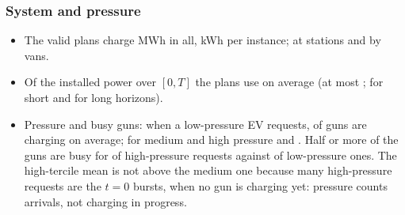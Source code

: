 \subsubsection{System and pressure}
\begin{table}[H]
\centering\small
\caption{Share of the 24 guns busy at the request time of free-choice EVs, by demand pressure tercile.}
\label{tab:utilpressure}

\end{table}
\begin{itemize}
  \item The valid plans charge \UEnergyTotal{} MWh in all, \UEnergyPerInst{} kWh per instance; \UEnergyFCSShare\pct{} at stations and \UEnergyVanShare\pct{} by vans.
  \item Of the installed power over $[0,T]$ the plans use \USystemMean\pct{} on average (at most \USystemMax\pct; \USystemShort\pct{} for short and \USystemLong\pct{} for long horizons).
  \item Pressure and busy guns: when a low-pressure EV requests, \UBusyAtRLow\pct{} of guns are charging on average; for medium and high pressure \UBusyAtRMedium\pct{} and \UBusyAtRHigh\pct. Half or more of the guns are busy for \UBusyHalfHigh\pct{} of high-pressure requests against \UBusyHalfLow\pct{} of low-pressure ones. The high-tercile mean is not above the medium one because many high-pressure requests are the $t=0$ bursts, when no gun is charging yet: pressure counts arrivals, not charging in progress.
\end{itemize}


